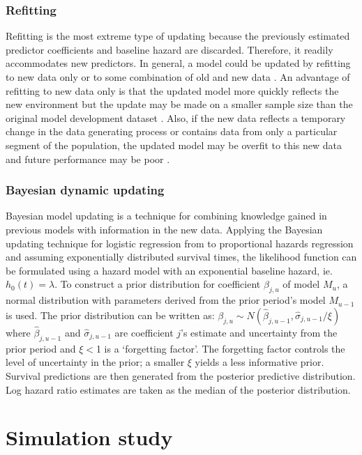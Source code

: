 \documentclass[]{article}
\begin{document}
\subsubsection{Refitting}
Refitting is the most extreme type of updating because the previously estimated predictor coefficients and baseline hazard are discarded. Therefore, it  readily accommodates new predictors. In general, a model could be updated by refitting to new data only or to some combination of old and new data \citep{Hickey2013, Schnellinger2021}. An advantage of refitting to new data only is that the updated model more quickly reflects the new environment but the update may be made on a smaller sample size than the original model development dataset \citep{Davis2019}. Also, if the new data reflects a temporary change in the data generating process or contains data from only a particular segment of the population, the updated model may be overfit to this new data and future performance may be poor \citep{Gama2014}. 


\subsubsection{Bayesian dynamic updating}
\label{sec:methodBayes}
Bayesian model updating is a technique for combining knowledge gained in previous models with information in the new data. Applying the Bayesian updating technique for logistic regression from \citet{McCormick2012} to proportional hazards regression and assuming exponentially distributed survival times, the likelihood function can be formulated using a hazard model with an exponential baseline hazard, ie. $h_0(t)= \lambda$. To construct a prior distribution for coefficient $\beta_{j,u}$ of model $M_u$, a normal distribution with parameters derived from the prior period's model $M_{u-1}$ is used. The prior distribution can be written as: $\beta_{j,u} \sim N(\hat{\beta}_{j,u-1}, \hat{\sigma}_{j, u-1}/\xi)$ where $\hat{\beta}_{j,u-1}$ and $\hat{\sigma}_{j,u-1}$ are coefficient $j$'s estimate and uncertainty from the prior period and $\xi < $1 is a `forgetting factor'. The forgetting factor controls the level of uncertainty in the prior; a smaller $\xi$ yields a less informative prior. Survival predictions are then generated from the posterior predictive distribution. Log hazard ratio estimates are taken as the median of the posterior distribution.




\section{Simulation study}
\label{sec:SimStudy}
\end{document}
